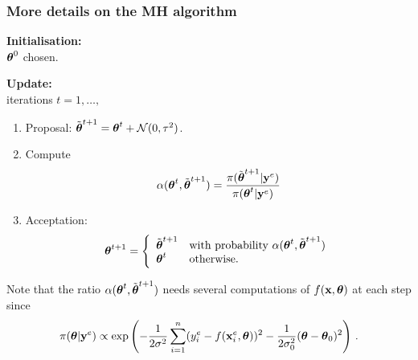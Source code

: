 \documentclass[nopagenumber,9pt]{beamer}
\begin{document}
\begin{frame}
 \frametitle{More details on the MH algorithm}
 
 \textbf{Initialisation:}\\
 $\boldsymbol{\theta}^0$ chosen.
 
 \bigskip
 
 \textbf{Update:}\\
 iterations $t=1,\ldots,$
\begin{enumerate}
 \item Proposal: $\tilde{\boldsymbol{\theta}}^{t+1}=\boldsymbol{\theta}^t+\mathcal{N}(0,\tau^2)$.
 \item Compute
 $$\alpha(\boldsymbol{\theta}^t,\tilde{\boldsymbol{\theta}}^{t+1})=\frac{\pi(\tilde{\boldsymbol{\theta}}^{t+1}|\mathbf{y}^{e})}{\pi(\boldsymbol{\theta}^{t}|\mathbf{y}^{e})}$$
 \item Acceptation:
 $$\boldsymbol{\theta}^{t+1}=\left\{\begin{array}{ll}
                       \tilde{\boldsymbol{\theta}}^{t+1}  & \text{with probability } \alpha(\boldsymbol{\theta}^t,\tilde{\boldsymbol{\theta}}^{t+1})\\
                       \boldsymbol{\theta}^t & \text{otherwise.}
                      \end{array}
 \right.$$
\end{enumerate}
 
 Note that the ratio $\alpha(\boldsymbol{\theta}^t,\tilde{\boldsymbol{\theta}}^{t+1})$
needs several computations of $f(\mathbf{x},\boldsymbol{\theta})$ at each step
 since $$\pi(\boldsymbol{\theta}|\mathbf{y}^{e})\propto
 \exp\left( 
-\frac{1}{2\sigma^2}\sum_{i=1}^n (y^{e}_i-f(\mathbf{x}^e_i,\boldsymbol{\theta}))^2-\frac{1}{2\sigma_0^2}(\boldsymbol{\theta}-\boldsymbol{\theta}_0)^2
\right)  \,.$$
 
 
 
\end{frame}
\end{document}
